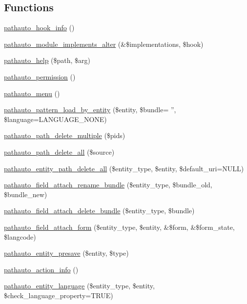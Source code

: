 \subsection*{Functions}
\begin{DoxyCompactItemize}
\item 
\hyperlink{pathauto_8module_aec3433593badeba9c5f6d72c727c0850}{pathauto\_\-hook\_\-info} ()
\item 
\hyperlink{pathauto_8module_aaf87f3ee5c92db465e39a83dafc7e470}{pathauto\_\-module\_\-implements\_\-alter} (\&\$implementations, \$hook)
\item 
\hyperlink{pathauto_8module_aa633ee0b08bc28c487cd4f3c21f7a001}{pathauto\_\-help} (\$path, \$arg)
\item 
\hyperlink{pathauto_8module_ae4a5383114e3ed0695e109bbde6590ca}{pathauto\_\-permission} ()
\item 
\hyperlink{pathauto_8module_a32103de2e3a1451e5396ef6d7bb0b53e}{pathauto\_\-menu} ()
\item 
\hyperlink{pathauto_8module_ae0f9acc2cba367467b5ef26d4d69e7b4}{pathauto\_\-pattern\_\-load\_\-by\_\-entity} (\$entity, \$bundle= '', \$language=LANGUAGE\_\-NONE)
\item 
\hyperlink{pathauto_8module_ae53404dbd7418362df6af153668af299}{pathauto\_\-path\_\-delete\_\-multiple} (\$pids)
\item 
\hyperlink{pathauto_8module_a5c4f73a894903516d1caecaf4f235378}{pathauto\_\-path\_\-delete\_\-all} (\$source)
\item 
\hyperlink{pathauto_8module_a3bc05a506e9cefc24923f10ae3069c79}{pathauto\_\-entity\_\-path\_\-delete\_\-all} (\$entity\_\-type, \$entity, \$default\_\-uri=NULL)
\item 
\hyperlink{pathauto_8module_a2a4e896ac2a2cadbef2fba1d848573c6}{pathauto\_\-field\_\-attach\_\-rename\_\-bundle} (\$entity\_\-type, \$bundle\_\-old, \$bundle\_\-new)
\item 
\hyperlink{pathauto_8module_a52aef356ab5cb0ed895cd418645512f5}{pathauto\_\-field\_\-attach\_\-delete\_\-bundle} (\$entity\_\-type, \$bundle)
\item 
\hyperlink{pathauto_8module_a5db998c6dbde2b0ccde267df64072f63}{pathauto\_\-field\_\-attach\_\-form} (\$entity\_\-type, \$entity, \&\$form, \&\$form\_\-state, \$langcode)
\item 
\hyperlink{pathauto_8module_ae713b574335b0b8a1069a37d63c5c365}{pathauto\_\-entity\_\-presave} (\$entity, \$type)
\item 
\hyperlink{pathauto_8module_a8ebf96e9fad62e05a7ea60bc34c85400}{pathauto\_\-action\_\-info} ()
\item 
\hyperlink{pathauto_8module_adef1a563cfdf18667ce09e30bacc5dd6}{pathauto\_\-entity\_\-language} (\$entity\_\-type, \$entity, \$check\_\-language\_\-property=TRUE)
\end{DoxyCompactItemize}
